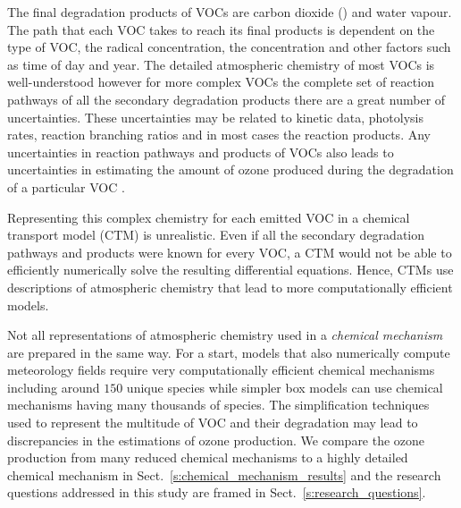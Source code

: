 The final degradation products of VOCs are carbon dioxide () and water vapour. 
The path that each VOC takes to reach its final products is dependent on the type of VOC, the radical concentration, the  concentration and other factors such as time of day and year. 
The detailed atmospheric chemistry of most VOCs is well-understood however for more complex VOCs the complete set of reaction pathways of all the secondary degradation products there are a great number of uncertainties. 
These uncertainties may be related to kinetic data, photolysis rates, reaction branching ratios and in most cases the reaction products.
Any uncertainties in reaction pathways and products of VOCs also leads to uncertainties in estimating the amount of ozone produced during the degradation of a particular VOC \citep{Atkinson:2000}.

Representing this complex chemistry for each emitted VOC in a chemical transport model (CTM) is unrealistic.
Even if all the secondary degradation pathways and products were known for every VOC, a CTM would not be able to efficiently numerically solve the resulting differential equations.
Hence, CTMs use descriptions of atmospheric chemistry that lead to more computationally efficient models.

Not all representations of atmospheric chemistry used in a \emph{chemical mechanism} are prepared in the same way.
For a start, models that also numerically compute meteorology fields require very computationally efficient chemical mechanisms including around $150$ unique species while simpler box models can use chemical mechanisms having many thousands of species.
The simplification techniques used to represent the multitude of VOC and their degradation may lead to discrepancies in the estimations of ozone production.
We compare the ozone production from many reduced chemical mechanisms to a highly detailed chemical mechanism in Sect.~\ref{s:chemical_mechanism_results} and the research questions addressed in this study are framed in Sect.~\ref{s:research_questions}.

